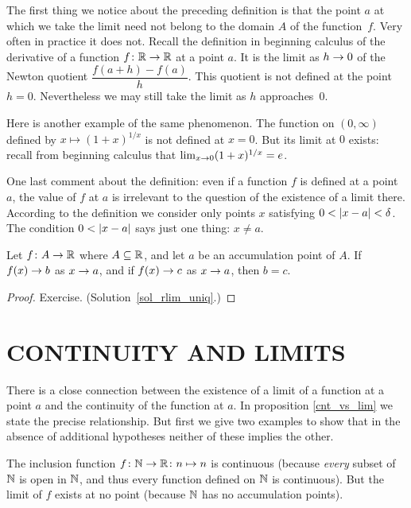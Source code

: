 The first thing we notice about the preceding definition is that the point $a$ at which we
take the limit need not belong to the domain $A$ of the function~$f$.  Very often in practice
it does not.  Recall the definition in beginning calculus of the derivative of a function $f
\colon \mathbb{R} \rightarrow \mathbb{R}$ at a point $a$.  It is the limit as $h \rightarrow 0$ of the Newton quotient
$\dfrac{f(a+h) - f(a)}h$. This quotient is not defined at the point $h = 0$.  Nevertheless we
may still take the limit as $h$ approaches~$0$.

Here is another example of the same phenomenon.  The function on $(0,\infty)$ defined by $x
\mapsto (1+x)^{1/x}$ is not defined at $x = 0$.  But its limit at $0$ exists: recall from
beginning calculus that $\lim_{x \rightarrow 0}(1+x)^{1/x} = e$.

One last comment about the definition: even if a function $f$ is defined at a point $a$, the
value of $f$ at $a$ is irrelevant to the question of the existence of a limit there.
According to the definition we consider only points $x$ satisfying $0 < \lvert x-a\rvert < \delta$.
The condition $0 < \lvert x-a\rvert$ says just one thing: $x \ne a$.

\begin{prop}\label{rlim_uniq} Let $f \colon A \rightarrow \mathbb{R}$ where $A \subseteq \mathbb{R}$, and let $a$ be an
accumulation point of $A$.  If $f(x) \rightarrow b$ as $x \rightarrow a$, and if $f(x) \rightarrow c$ as $x \rightarrow
a$, then $b = c$.
\end{prop}

\begin{proof} Exercise.  (Solution~\ref{sol_rlim_uniq}.)
  \ns \end{proof}









\section{CONTINUITY AND LIMITS}
There is a close connection between the existence of a limit of a function at a point $a$ and
the continuity of the function at $a$. In proposition \ref{cnt_vs_lim} we state the precise
relationship. But first we give two examples to show that in the absence of additional
hypotheses neither of these implies the other.

\begin{exam} The inclusion function $f \colon  \mathbb{N} \rightarrow \mathbb{R} \colon  n \mapsto n$ is continuous
(because \emph{every} subset of $\mathbb{N}$ is open in $\mathbb{N}$, and thus every function defined on $\mathbb{N}$
is continuous).  But the limit of $f$ exists at no point (because $\mathbb{N}$ has no accumulation
points).
\end{exam}

